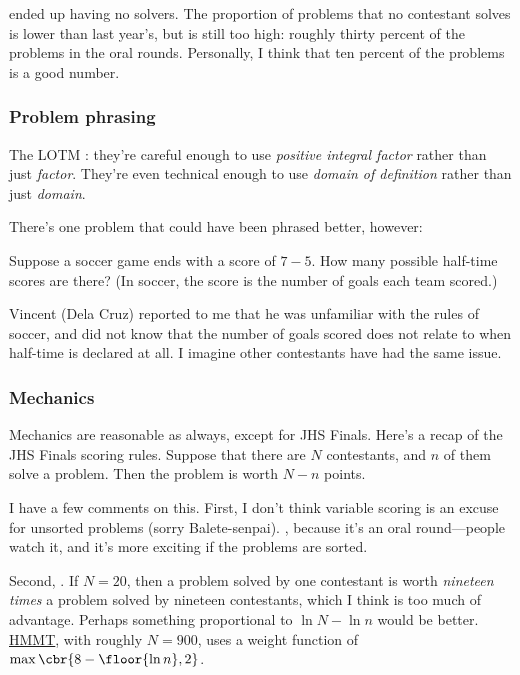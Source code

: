 \documentclass[11pt,paper=letter]{scrartcl}
\begin{document}
\noindent ended up having no solvers. The proportion of problems that no contestant solves is lower than last year's, but is still too high: roughly thirty percent of the problems in the oral rounds. Personally, I think that ten percent of the problems is a good number.

\subsubsection*{Problem phrasing}

The LOTM : they're careful enough to use \emph{positive integral factor} rather than just \emph{factor}. They're even technical enough to use \emph{domain of definition} rather than just \emph{domain}. 

There's one problem that could have been phrased better, however:

\begin{probboxed}
   Suppose a soccer game ends with a score of $7-5$. How many possible half-time scores are there? (In soccer, the score is the number of goals each team scored.)
\end{probboxed}

Vincent (Dela Cruz) reported to me that he was unfamiliar with the rules of soccer, and did not know that the number of goals scored does not relate to when half-time is declared at all. I imagine other contestants have had the same issue.

\subsubsection*{Mechanics}

Mechanics are reasonable as always, except for JHS Finals. Here's a recap of the JHS Finals scoring rules. Suppose that there are $N$ contestants, and $n$ of them solve a problem. Then the problem is worth $N - n$ points. 

I have a few comments on this. First, I don't think variable scoring is an excuse for unsorted problems (sorry Balete-senpai). , because it's an oral round---people watch it, and it's more exciting if the problems are sorted.

Second, . If $N = 20$, then a problem solved by one contestant is worth \emph{nineteen times} a problem solved by nineteen contestants, which I think is too much of advantage. Perhaps something proportional to $\ln N - \ln n$ would be better. \href{http://www.hmmt.co/static/scoring-algorithm.pdf}{HMMT}, with roughly $N = 900$, uses a weight function of $\max\cbr{8 - \floor{\ln n}, 2}$.
\end{document}

